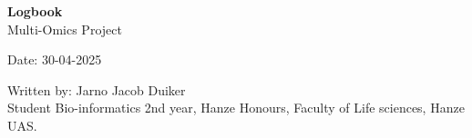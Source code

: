 \begin{center}

    {\Large \textbf{Logbook} \\ Multi-Omics Project}
    \vspace{1em}

    Date: 30-04-2025
    
    \vspace{1em}
    
    Written by: Jarno Jacob Duiker \\ Student Bio-informatics 2nd year, Hanze Honours, Faculty of Life sciences, Hanze UAS.

    
    \vspace{1em}
    
    
    
    
    \vspace{2em}
    
    
    
    \hrulefill
    
\end{center}

\vspace{1em}

\newpage

